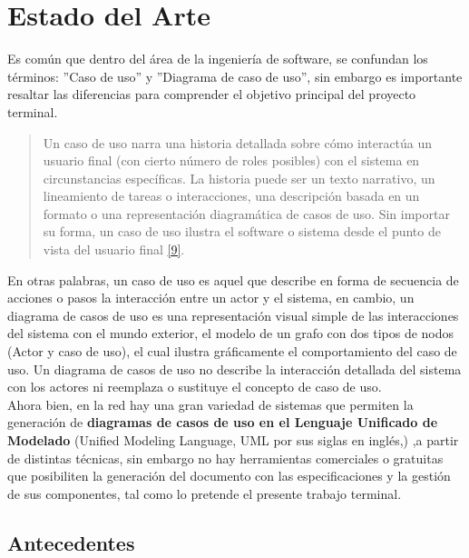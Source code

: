 \chapter{Estado del Arte} \label{cap:tres}

	Es común que dentro del área de la ingeniería de software, se confundan los términos: ''Caso de uso'' y ''Diagrama de caso de uso'', sin embargo es importante resaltar las diferencias para comprender el objetivo principal del proyecto terminal.
	
	\begin{quote}
		\small Un caso de uso narra una historia detallada sobre cómo interactúa un usuario final (con cierto número de roles posibles) con el sistema en circunstancias específicas. La historia puede ser un texto narrativo, un lineamiento de tareas o interacciones, una descripción basada en un formato o una representación diagramática de casos de uso. Sin importar su forma, un caso de uso ilustra el software o sistema desde el punto de vista del usuario final \hyperlink{b09}{[9]}. 
	\end{quote}
	 	
	En otras palabras, un caso de uso es aquel que describe en forma de secuencia de acciones o pasos la interacción entre un actor y el sistema, en cambio, un diagrama de casos de uso es una representación visual simple de las interacciones del sistema con el mundo exterior, el modelo de un grafo con dos tipos de nodos (Actor y caso de uso), el cual ilustra gráficamente el comportamiento del caso de uso. Un diagrama de casos de uso no describe la interacción detallada del sistema con los actores ni reemplaza o sustituye el concepto de caso de uso.\\
	
	Ahora bien, en la red hay una gran variedad de sistemas que permiten la generación de \textbf {diagramas de casos de uso en el Lenguaje Unificado de Modelado} (Unified Modeling Language, UML por sus siglas en inglés,) ,a partir de distintas técnicas, sin embargo no hay herramientas comerciales o gratuitas que posibiliten la generación del documento con las especificaciones y la gestión de sus componentes, tal como lo pretende el presente trabajo terminal.
	
    \newpage
\section{Antecedentes}

